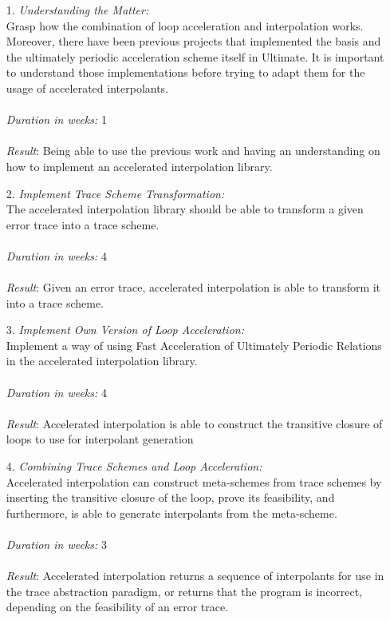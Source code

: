 \documentclass{article}
\begin{document}
\begin{itemize}
	\item[1.] \textsl{Understanding the Matter:} \\
	Grasp how the combination of loop acceleration and interpolation works. \\
	Moreover, there have been previous projects that implemented the basis \cite{ClausThesis} and the ultimately periodic acceleration scheme itself \cite{JillThesis} in Ultimate. It is important to understand those implementations before trying to adapt them for the usage of accelerated interpolants. \\ \\
	\textsl{Duration in weeks:} 1 \\\\
	\textsl{Result}: Being able to use the previous work and having an understanding on how to implement an accelerated interpolation library.
	\item[2.] \textsl{Implement Trace Scheme Transformation:} \\
	The accelerated interpolation library should be able to transform a given error trace into a trace scheme. \\\\
	\textsl{Duration in weeks:} 4 \\\\
	\textsl{Result}: Given an error trace, accelerated interpolation is able to transform it into a trace scheme.
	
	\item[3.] \textsl{Implement Own Version of Loop Acceleration:} \\
	Implement a way of using Fast Acceleration of Ultimately Periodic Relations in the accelerated interpolation library. \\ \\
	\textsl{Duration in weeks:} 4 \\ \\
	\textsl{Result}: Accelerated interpolation is able to construct the transitive closure of loops to use for interpolant generation
	
	\item[4.] \textsl{Combining Trace Schemes and Loop Acceleration:} \\
	Accelerated interpolation can construct meta-schemes from trace schemes by inserting the transitive closure of the loop, prove its feasibility, and furthermore, is able to generate interpolants from the meta-scheme. \\ \\
	\textsl{Duration in weeks:} 3 \\\\
	\textsl{Result}: Accelerated interpolation returns a sequence of interpolants for use in the trace abstraction paradigm, or returns that the program is incorrect, depending on the feasibility of an error trace.
	

\end{itemize}
\end{document}
